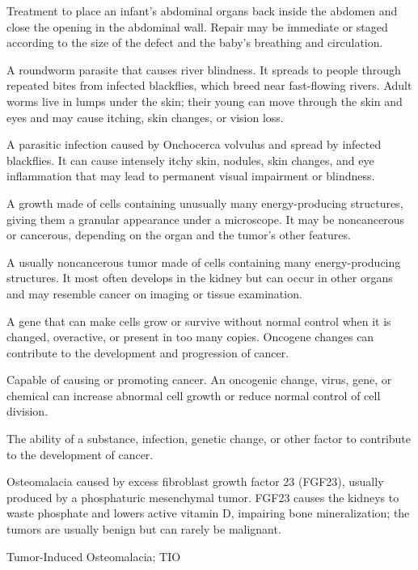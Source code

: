  Treatment to place an infant's abdominal organs back inside the abdomen and close the opening in the abdominal wall. Repair may be immediate or staged according to the size of the defect and the baby's breathing and circulation.

 A roundworm parasite that causes river blindness. It spreads to people through repeated bites from infected blackflies, which breed near fast-flowing rivers. Adult worms live in lumps under the skin; their young can move through the skin and eyes and may cause itching, skin changes, or vision loss.

 A parasitic infection caused by Onchocerca volvulus and spread by infected blackflies. It can cause intensely itchy skin, nodules, skin changes, and eye inflammation that may lead to permanent visual impairment or blindness.

 A growth made of cells containing unusually many energy-producing structures, giving them a granular appearance under a microscope. It may be noncancerous or cancerous, depending on the organ and the tumor’s other features.

 A usually noncancerous tumor made of cells containing many energy-producing structures. It most often develops in the kidney but can occur in other organs and may resemble cancer on imaging or tissue examination.

 A gene that can make cells grow or survive without normal control when it is changed, overactive, or present in too many copies. Oncogene changes can contribute to the development and progression of cancer.

 Capable of causing or promoting cancer. An oncogenic change, virus, gene, or chemical can increase abnormal cell growth or reduce normal control of cell division.

 The ability of a substance, infection, genetic change, or other factor to contribute to the development of cancer.

 Osteomalacia caused by excess fibroblast growth factor 23 (FGF23), usually produced by a phosphaturic mesenchymal tumor. FGF23 causes the kidneys to waste phosphate and lowers active vitamin D, impairing bone mineralization; the tumors are usually benign but can rarely be malignant.

\synonyms
Tumor-Induced Osteomalacia; TIO

